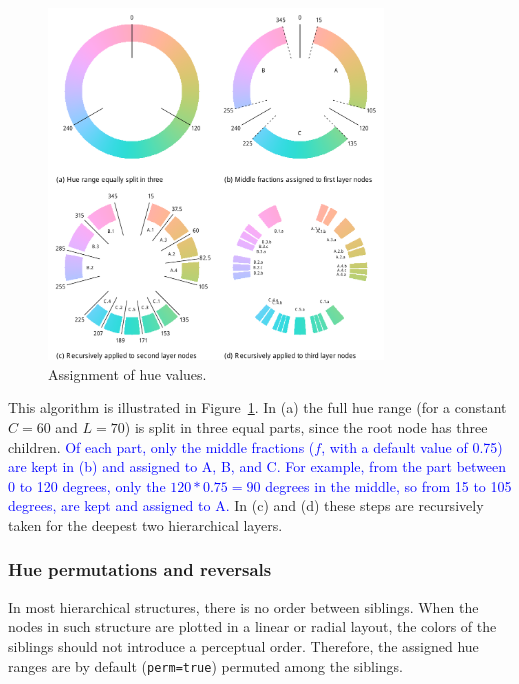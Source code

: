 \documentclass[journal]{vgtc}                %
\newcommand{\changedM}[1]{\textcolor{blue}{#1}}
\begin{document}
\begin{figure}[tb]
  \centering
  \includegraphics[width=3.5in]{hcl_method2.pdf}
  \caption{Assignment of hue values.}\label{fig:wheel}
\end{figure}

This algorithm is illustrated in Figure~\ref{fig:wheel}. In (a) the full hue range (for a constant $C=60$ and $L=70$)  is split in three equal parts, since the root node has three children. \changedM{Of each part, only the middle fractions ($f$, with a default value of 0.75) are kept in (b) and assigned to A, B, and C. For example, from the part between 0 to 120 degrees, only the $120*0.75=90$ degrees in the middle, so from 15 to 105 degrees, are kept and assigned to A.} In (c) and (d) these steps are recursively taken for the deepest two hierarchical layers.

\subsubsection{Hue permutations and reversals}

In most hierarchical structures, there is no order between siblings. 
When the nodes in such structure are plotted in a linear or radial layout, 
the colors of the siblings should not introduce a perceptual order. Therefore, the assigned hue 
ranges are by default (\texttt{perm=true}) permuted among the siblings. 
\end{document}
